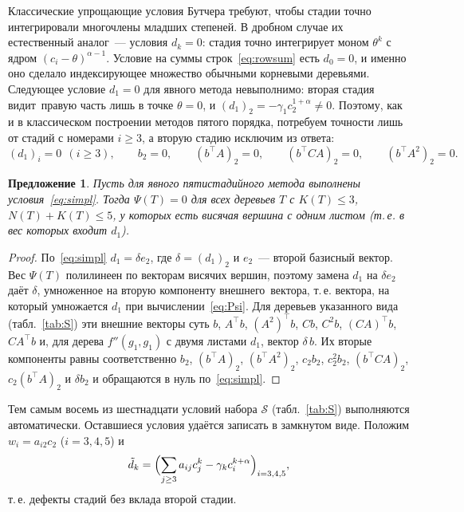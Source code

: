 \documentclass[11pt,a4paper]{article}
\theoremstyle{plain}
\newtheorem{proposition}{Предложение}
\theoremstyle{definition}
\begin{document}
Классические упрощающие условия Бутчера требуют, чтобы стадии точно интегрировали многочлены младших степеней. В дробном случае их естественный аналог~--- условия $d_k=0$: стадия точно интегрирует моном $\theta^k$ с ядром $(c_i-\theta)^{\alpha-1}$. Условие на суммы строк~\eqref{eq:rowsum} есть $d_0=0$, и именно оно сделало индексирующее множество обычными корневыми деревьями. Следующее условие $d_1=0$ для явного метода невыполнимо: вторая стадия \guillemotleft видит\guillemotright\ правую часть лишь в точке $\theta=0$, и $(d_1)_2=-\gamma_1c_2^{1+\alpha}\ne0$. Поэтому, как и в классическом построении методов пятого порядка, потребуем точности лишь от стадий с номерами $i\ge3$, а вторую стадию исключим из ответа:
\begin{equation}\label{eq:simpl}
(d_1)_i=0\ \ (i\ge3),\qquad b_2=0,\qquad (b^{\top}A)_2=0,\qquad (b^{\top}CA)_2=0,\qquad (b^{\top}A^2)_2=0 .
\end{equation}

\begin{proposition}\label{prop:simpl}
Пусть для явного пятистадийного метода выполнены условия~\eqref{eq:simpl}. Тогда $\Psi(T)=0$ для всех деревьев $T$ с $K(T)\le3$, $N(T)+K(T)\le5$, у которых есть висячая вершина с одним листом (т.\,е. в вес которых входит $d_1$).
\end{proposition}
\begin{proof}
По~\eqref{eq:simpl} $d_1=\delta e_2$, где $\delta=(d_1)_2$ и $e_2$~--- второй базисный вектор. Вес $\Psi(T)$ полилинеен по векторам висячих вершин, поэтому замена $d_1$ на $\delta e_2$ даёт $\delta$, умноженное на вторую компоненту \guillemotleft внешнего\guillemotright\ вектора, т.\,е. вектора, на который умножается $d_1$ при вычислении~\eqref{eq:Psi}. Для деревьев указанного вида (табл.~\ref{tab:S}) эти внешние векторы суть $b$, $A^{\top}b$, $(A^2)^{\top}b$, $Cb$, $C^2b$, $(CA)^{\top}b$, $C A^{\top}b$ и, для дерева $f''(g_1,g_1)$ с двумя листами $d_1$, вектор $\delta\,b$. Их вторые компоненты равны соответственно $b_2$, $(b^{\top}A)_2$, $(b^{\top}A^2)_2$, $c_2b_2$, $c_2^2b_2$, $(b^{\top}CA)_2$, $c_2(b^{\top}A)_2$ и $\delta b_2$ и обращаются в нуль по~\eqref{eq:simpl}.
\end{proof}

Тем самым восемь из шестнадцати условий набора $\mathcal S$ (табл.~\ref{tab:S}) выполняются автоматически. Оставшиеся условия удаётся записать в замкнутом виде. Положим $w_i=a_{i2}c_2$ ($i=3,4,5$) и
\[
\tilde d_k=\Bigl(\sum_{j\ge3}a_{ij}c_j^k-\gamma_kc_i^{k+\alpha}\Bigr)_{i=3,4,5},
\]
т.\,е. дефекты стадий без вклада второй стадии.
\end{document}
